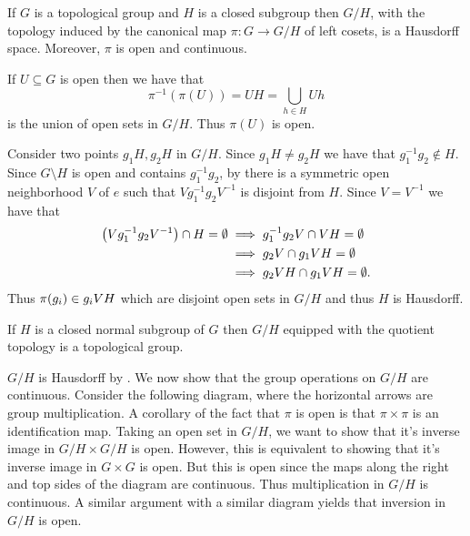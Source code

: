 \documentclass[letterpaper, 11pt, oneside]{book}
\begin{document}
\clearpage

\begin{prop}\label{prop: quotient_hausdorff}
  If $G$ is a topological group and $H$ is a closed subgroup then $G / H$, with the topology induced by the canonical map $\pi\colon G \to G / H$ of left cosets, is a Hausdorff space.
  Moreover, $\pi$ is open and continuous.
\end{prop}
\begin{pf}
  If $U \subseteq G$ is open then we have that
  \[
    \pi^{-1}(\pi(U)) = UH = \bigcup_{h \in H} Uh
  \]
  is the union of open sets in $G / H$.
  Thus $\pi(U)$ is open.

  Consider two points $g_{1}H, g_{2}H$ in $G / H$.
  Since $g_{1}H \neq g_{2}H$ we have that $g_{1}^{-1}g_{2} \notin H$.
  Since $G \setminus H$ is open and contains $g_{1}^{-1} g_{2}$, by  there is a symmetric open neighborhood $V$ of $e$ such that $V g_{1}^{-1} g_{2} V^{-1}$ is disjoint from $H$.
  Since $V = V^{-1}$ we have that
  \begin{align*}
    \pqty{V g_{1}^{-1} g_{2} V^{-1}} \cap H = \emptyset &\implies g_{1}^{-1} g_{2} V \cap VH = \emptyset \\
                                                        &\implies g_{2} V \cap g_{1} VH = \emptyset \\
                                                        &\implies g_{2} V H \cap g_{1} V H = \emptyset.
  \end{align*}
  Thus $\pi\pqty{g_{i}} \in g_{i} VH$ which are disjoint open sets in $G / H$ and thus $H$ is Hausdorff.
\end{pf}

\begin{prop}
  If $H$ is a closed normal subgroup of $G$ then $G / H$ equipped with the quotient topology is a topological group.
\end{prop}
\begin{pf}
  $G / H$ is Hausdorff by .
  We now show that the group operations on $G / H$ are continuous.
  Consider the following diagram, where the horizontal arrows are group multiplication.
  A corollary of the fact that $\pi$ is open is that $\pi \times \pi$ is an identification map.
  Taking an open set in $G / H$, we want to show that it's inverse image in $G / H \times G / H$ is open.
  However, this is equivalent to showing that it's inverse image in $G \times G$ is open.
  But this is open since the maps along the right and top sides of the diagram are continuous.
  Thus multiplication in $G / H$ is continuous.
  A similar argument with a similar diagram yields that inversion in $G / H$ is open.
\end{pf}
\end{document}
